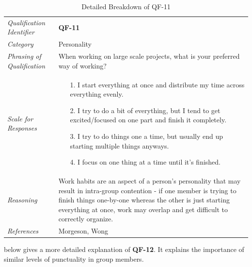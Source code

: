 \documentclass[12pt,letterpaper]{article}
\begin{document}
\begin{table}[H]
	\caption{Detailed Breakdown of QF-11}
	\begin{tabu} to 
		\toprule
		Qualification Identifier & {\bf QF-11}\\
		Category & Personality \\
		Phrasing of Qualification & When working on large scale projects, what is your preferred way of working? \\
		Scale for Responses &
		\begin{minipage}[t]{\linewidth}
			\begin{enumerate}
				\item[1.] I start everything at once and distribute my time across everything evenly.
				\item[2.] I try to do a bit of everything, but I tend to get excited/focused on one part and finish it completely.
				\item[3.] I try to do things one a time, but usually end up starting multiple things anyways.
				\item[4.] I focus on one thing at a time until it's finished.
			\end{enumerate}
		\end{minipage}\\
		Reasoning & Work habits are an aspect of a person's personality that may result in intra-group contention - if one member is trying to finish things one-by-one whereas the other is just starting everything at once, work may overlap and get difficult to correctly organize.\\
		References & Morgeson\cite{morgeson}, Wong\cite{wong}\\
		\toprule
	\end{tabu}
\end{table}

 below gives a more detailed explanation of {\bf QF-12}. It explains the importance of similar levels of punctuality in group members.
\end{document}
